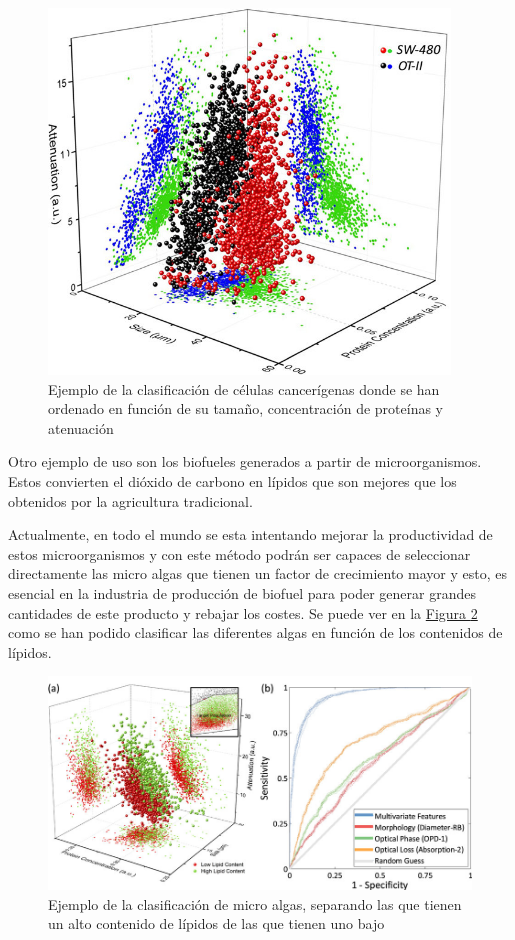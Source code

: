 \documentclass[a4paper, 12pt, UTF8]{article}
\begin{document}
\begin{figure}[h!]
	\centering
	\includegraphics[width=0.95\textwidth]{impacto_1}
	\caption{Ejemplo de la clasificación de células cancerígenas donde se han ordenado en función de su tamaño, concentración de proteínas y atenuación}
	\label{fig:impacto_1}
\end{figure}

Otro ejemplo de uso son los biofueles generados a partir de microorganismos. Estos convierten el dióxido de carbono en lípidos que son mejores que los obtenidos por la agricultura tradicional. 

Actualmente, en todo el mundo se esta intentando mejorar la productividad de estos microorganismos y con este método podrán ser capaces de seleccionar directamente las micro algas que tienen un factor de crecimiento mayor y esto, es esencial en la industria de producción de biofuel para poder generar grandes cantidades de este producto y rebajar los costes. Se puede ver en la \hyperref[fig:impacto_2]{Figura \ref{fig:impacto_2}} como se han podido clasificar las diferentes algas en función de los contenidos de lípidos.

\begin{figure}[h!]
	\centering
	\includegraphics[width=\linewidth]{impacto_2}
	\caption{Ejemplo de la clasificación de micro algas, separando las que tienen un alto contenido de lípidos de las que tienen uno bajo}
	\label{fig:impacto_2}
\end{figure}
\end{document}
